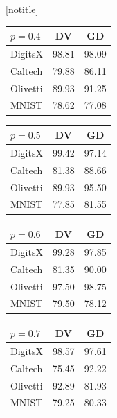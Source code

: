 \documentclass[final,hyperref={pdfpagelabels=false},notheorems]{beamer}
\newcommand{\shrink}{-15pt}
\theoremstyle{thesisstyle}
\begin{document}
\begin{frame}[t]
\begin{columns}[t]
  \begin{column}{.5225\textwidth}

    \vspace{\shrink}
    [notitle]
    \begin{block}{}
      \begin{table}[h]
        \begin{tabular}{l|c|c}
          $p=0.4$ & DV & GD\\
          \hline
          DigitsX & 98.81 & 98.09\\
          Caltech & 79.88 & 86.11\\
          Olivetti& 89.93 & 91.25\\
          MNIST   & 78.62 & 77.08\\
        \end{tabular}\hspace{2.5cm}
        \begin{tabular}{l|c|c}
          $p=0.5$ & DV & GD\\
          \hline
          DigitsX & 99.42 & 97.14\\
          Caltech & 81.38 & 88.66\\
          Olivetti& 89.93 & 95.50\\
          MNIST   & 77.85 & 81.55\\
        \end{tabular}\hspace{2.5cm}
        \begin{tabular}{l|c|c}
          $p=0.6$ & DV & GD\\
          \hline
          DigitsX & 99.28 & 97.85\\
          Caltech & 81.35 & 90.00\\
          Olivetti& 97.50 & 98.75\\
          MNIST   & 79.50 & 78.12\\
        \end{tabular}
        \begin{tabular}{l|c|c}
          $p=0.7$ & DV & GD\\
          \hline
          DigitsX & 98.57 & 97.61\\
          Caltech & 75.45 & 92.22\\
          Olivetti& 92.89 & 81.93\\
          MNIST   & 79.25 & 80.33\\
        \end{tabular}\hspace{2.5cm}

\end{table}
\end{block}
\end{column}
\end{columns}
\end{frame}
\end{document}
